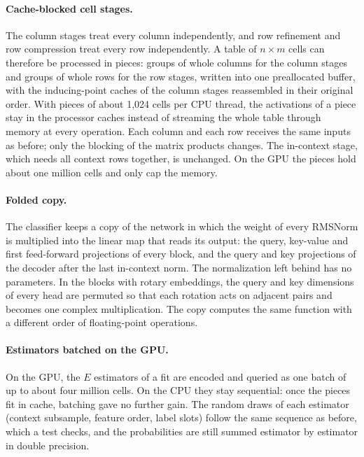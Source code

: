 \documentclass[11pt]{article}
\begin{document}
\paragraph{Cache-blocked cell stages.} The column stages treat every column independently, and row refinement
and row compression treat every row independently. A table of $n\times m$ cells can therefore be processed in
pieces: groups of whole columns for the column stages and groups of whole rows for the row stages, written into
one preallocated buffer, with the inducing-point caches of the column stages reassembled in their original order.
With pieces of about 1,024 cells per CPU thread, the activations of a piece stay in the processor caches instead
of streaming the whole table through memory at every operation. Each column and each row receives the same inputs
as before; only the blocking of the matrix products changes. The in-context stage, which needs all context rows
together, is unchanged. On the GPU the pieces hold about one million cells and only cap the memory.

\paragraph{Folded copy.} The classifier keeps a copy of the network in which the weight of every RMSNorm is
multiplied into the linear map that reads its output: the query, key-value and first feed-forward projections of
every block, and the query and key projections of the decoder after the last in-context norm. The normalization
left behind has no parameters. In the blocks with rotary embeddings, the query and key dimensions of every head
are permuted so that each rotation acts on adjacent pairs and becomes one complex multiplication. The copy
computes the same function with a different order of floating-point operations.

\paragraph{Estimators batched on the GPU.} On the GPU, the $E$ estimators of a fit are encoded and queried as one
batch of up to about four million cells. On the CPU they stay sequential: once the pieces fit in cache, batching
gave no further gain. The random draws of each estimator (context subsample, feature order, label slots) follow
the same sequence as before, which a test checks, and the probabilities are still summed estimator by estimator in
double precision.
\end{document}
